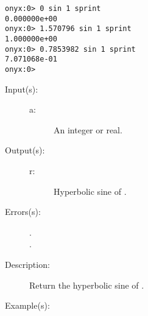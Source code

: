 \begin{description}
\begin{description}
\begin{verbatim}
onyx:0> 0 sin 1 sprint
0.000000e+00
onyx:0> 1.570796 sin 1 sprint
1.000000e+00
onyx:0> 0.7853982 sin 1 sprint
7.071068e-01
onyx:0>
		\end{verbatim}
	\end{description}
\label{systemdict:sinh}
\item[{\onyxop{a}{sinh}{r}}: ]
	\begin{description}\item[]
	\item[Input(s): ]
		\begin{description}\item[]
		\item[a: ]
			An integer or real.
		\end{description}
	\item[Output(s): ]
		\begin{description}\item[]
		\item[r: ]
			Hyperbolic sine of .
		\end{description}
	\item[Errors(s): ]
		\begin{description}\item[]
		\item[.]
		\item[.]
		\end{description}
	\item[Description: ]
		Return the hyperbolic sine of .
	\item[Example(s): ]\begin{verbatim}


\end{verbatim}
\end{description}
\end{description}
